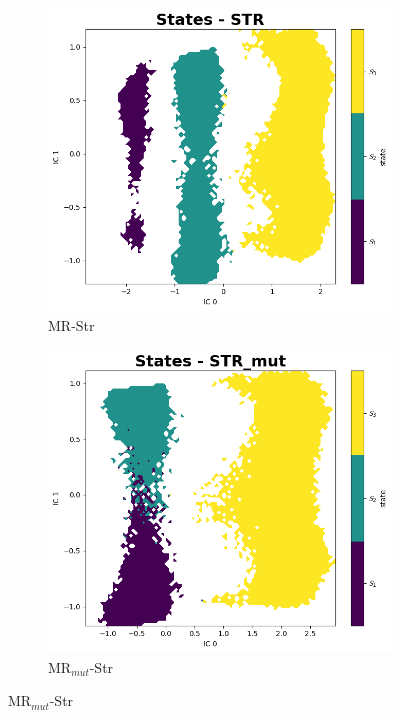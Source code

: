 \documentclass[
  journal=usp, %
  manuscript=final-report,
  year=2023,
  volume=1,
]{cup-journal}
\begin{document}
{\begin{figure}[hbt!]
\medskip %
\begin{subfigure}{.45\linewidth}
  \includegraphics[width=\linewidth]{Images/States_STR_7000K.png}
  \caption{MR-Str}
  \label{MC_states_MR-str}
\end{subfigure}\hfill %
\begin{subfigure}{.45\linewidth}
  \includegraphics[width=\linewidth]{Images/States_STR_mut_7000K.png}
  \caption{MR$_{mut}$-Str}
  \label{MC_states_MR-str_mut}
\end{subfigure}


\end{figure}}
\end{document}
